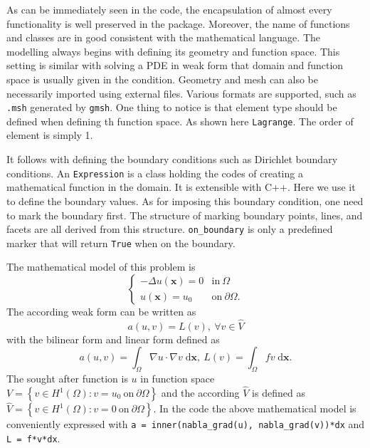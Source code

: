 \documentclass[10pt,a4paper]{scrreprt}
\newcommand{\myd}{\;\mathrm{d}}
\begin{document}
As can be immediately seen in the code, the encapsulation of almost every functionality is well preserved in the package. Moreover, the name of functions and classes are in good consistent with the mathematical language. The modelling always begins with defining its geometry and function space. This setting is similar with solving a PDE in weak form that domain and function space is usually given in the condition. Geometry and mesh can also be necessarily imported using external files. Various formats are supported, such as \texttt{.msh} generated by \texttt{gmsh}. One thing to notice is that element type should be defined when defining th function space. As shown here \texttt{Lagrange}. The order of element is simply 1.

It follows with defining the boundary conditions such as Dirichlet boundary conditions. An \texttt{Expression} is a class holding the codes of creating a mathematical function in the domain. It is extensible with C++. Here we use it to define the boundary values. As for imposing this boundary condition, one need to mark the boundary first. The structure of marking boundary points, lines, and facets are all derived from this structure. \texttt{on\_boundary} is only a predefined marker that will return \texttt{True} when on the boundary.

The mathematical model of this problem is 
\begin{equation}
\label{eq: poisson}
\left\{
\begin{array}{ll}
-\Delta u(\mathbf{x})=0 & \text{in} \ \Omega \\
u(\mathbf{x})=u_{0} & \text{on} \ \partial \Omega .
\end{array}
\right.
\end{equation}
The according weak form can be written as
\begin{equation}
\label{eq: weak}
a(u,v) = L(v), \ \forall v \in \hat{V}
\end{equation}
with the bilinear form and linear form defined as
\[
a(u,v) = \int_{\Omega} \nabla{u} \cdot \nabla{v} \myd{\mathbf{x}}, \ L(v) = \int_{\Omega} fv \myd{\mathbf{x}}.
\]
The sought after function is $u$ in function space $V = \left\lbrace v \in H^{1}\left( \Omega \right) : v=u_{0} \  \text{on} \ \partial \Omega \right\rbrace$ and the according $\hat{V}$ is defined as $\hat{V} = \left\lbrace v \in H^{1}\left( \Omega \right) : v=0 \  \text{on} \ \partial \Omega \right\rbrace$. In the code the above mathematical model is conveniently expressed with \texttt{a\ =\ inner(nabla\_grad(u),\ nabla\_grad(v))*dx} and \texttt{L\ =\ f*v*dx}.
\end{document}
